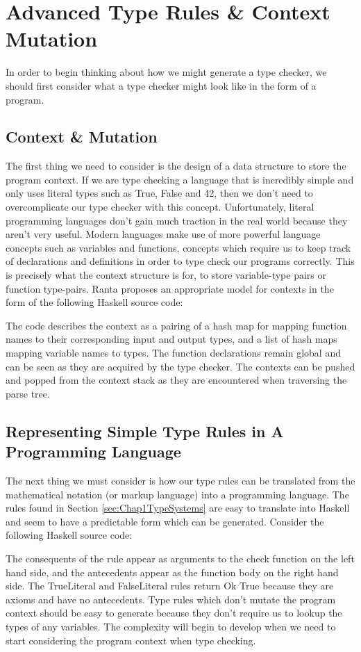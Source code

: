 \documentclass{UoYCSproject}
\begin{document}
\section{Advanced Type Rules \& Context Mutation}
In order to begin thinking about how we might generate a type checker, we should
first consider what a type checker might look like in the form of a program.

\subsection{Context \& Mutation}
The first thing we need to consider is the design of a data structure to store
the program context. If we are type checking a language that is incredibly simple 
and only uses literal types such as True, False and 42, then we don't need to 
overcomplicate our type checker with this concept. Unfortunately, literal 
programming languages don't gain much traction in the real world because they 
aren't very useful. Modern languages make use of more powerful language concepts 
such as variables and functions, concepts which require us to keep track of
declarations and definitions in order to type check our programs correctly. This
is precisely what the context structure is for, to store variable-type pairs or
function type-pairs. Ranta \cite{Ranta} proposes an appropriate model for
contexts in the form of the following Haskell source code:
\lstset{language=Haskell,
    basicstyle=\ttfamily}

The code describes the context as a pairing of a hash map for mapping function
names to their corresponding input and output types, and a list of hash maps
mapping variable names to types. The function declarations remain global and can
be seen as they are acquired by the type checker. The contexts can be pushed
and popped from the context stack as they are encountered when traversing the 
parse tree.

\subsection{Representing Simple Type Rules in A Programming Language}
The next thing we must consider is how our type rules can be translated from the
mathematical notation (or markup language) into a programming language. The 
rules found in Section \ref{sec:Chap1TypeSystems} are easy to translate into 
Haskell and seem to have a predictable form which can be generated. Consider
the following Haskell source code:

The consequents of the rule appear as arguments to the check function on the
left hand side, and the antecedents appear as the function body on the right
hand side. The TrueLiteral and FalseLiteral rules return {\ttfamily Ok True} 
because they are axioms and have no antecedents. Type rules which don't mutate
the program context should be easy to generate because they don't require us 
to lookup the types of any variables. The complexity will begin to develop when
we need to start considering the program context when type checking.
\end{document}
